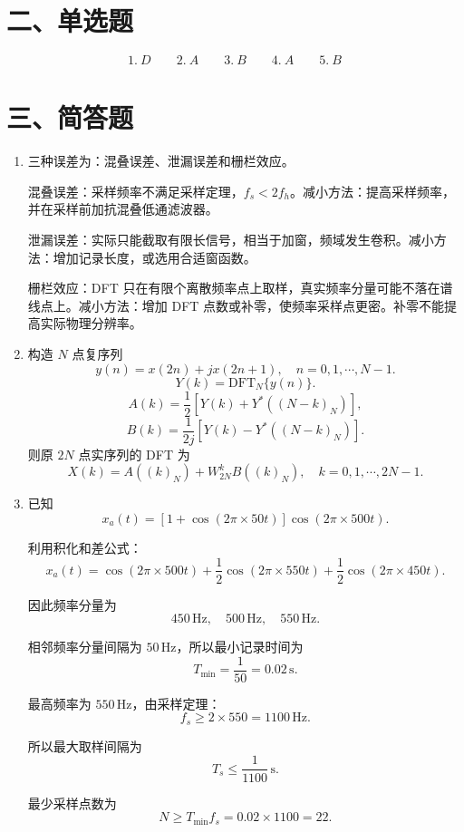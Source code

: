 \documentclass[UTF8,a4paper,12pt]{ctexart}
\begin{document}
\section*{二、单选题}

\[
\boxed{1.\ D \qquad 2.\ A \qquad 3.\ B \qquad 4.\ A \qquad 5.\ B}
\]

\section*{三、简答题}

\begin{enumerate}[label=\arabic*., leftmargin=2em]

\item 三种误差为：混叠误差、泄漏误差和栅栏效应。

混叠误差：采样频率不满足采样定理，$f_s<2f_h$。减小方法：提高采样频率，并在采样前加抗混叠低通滤波器。

泄漏误差：实际只能截取有限长信号，相当于加窗，频域发生卷积。减小方法：增加记录长度，或选用合适窗函数。

栅栏效应：DFT 只在有限个离散频率点上取样，真实频率分量可能不落在谱线点上。减小方法：增加 DFT 点数或补零，使频率采样点更密。补零不能提高实际物理分辨率。

\item 构造 $N$ 点复序列
\[
y(n)=x(2n)+jx(2n+1),\quad n=0,1,\cdots,N-1.
\]
\[
Y(k)=\mathrm{DFT}_N\{y(n)\}.
\]
\[
A(k)=\frac{1}{2}\left[Y(k)+Y^*((N-k)_N)\right],
\]
\[
B(k)=\frac{1}{2j}\left[Y(k)-Y^*((N-k)_N)\right].
\]
则原 $2N$ 点实序列的 DFT 为
\[
X(k)=A((k)_N)+W_{2N}^{k}B((k)_N),
\quad k=0,1,\cdots,2N-1.
\]

\item
已知
\[
x_a(t)=[1+\cos(2\pi\times 50t)]\cos(2\pi\times 500t).
\]

利用积化和差公式：
\[
x_a(t)=\cos(2\pi\times500t)
+\frac12\cos(2\pi\times550t)
+\frac12\cos(2\pi\times450t).
\]

因此频率分量为
\[
450\,\mathrm{Hz},\quad 500\,\mathrm{Hz},\quad 550\,\mathrm{Hz}.
\]

相邻频率分量间隔为 $50\,\mathrm{Hz}$，所以最小记录时间为
\[
T_{\min}=\frac{1}{50}=0.02\,\mathrm{s}.
\]

最高频率为 $550\,\mathrm{Hz}$，由采样定理：
\[
f_s\geq 2\times550=1100\,\mathrm{Hz}.
\]

所以最大取样间隔为
\[
T_s\leq \frac{1}{1100}\,\mathrm{s}.
\]

最少采样点数为
\[
N\geq T_{\min}f_s
=0.02\times1100
=22.
\]

\end{enumerate}
\end{document}
